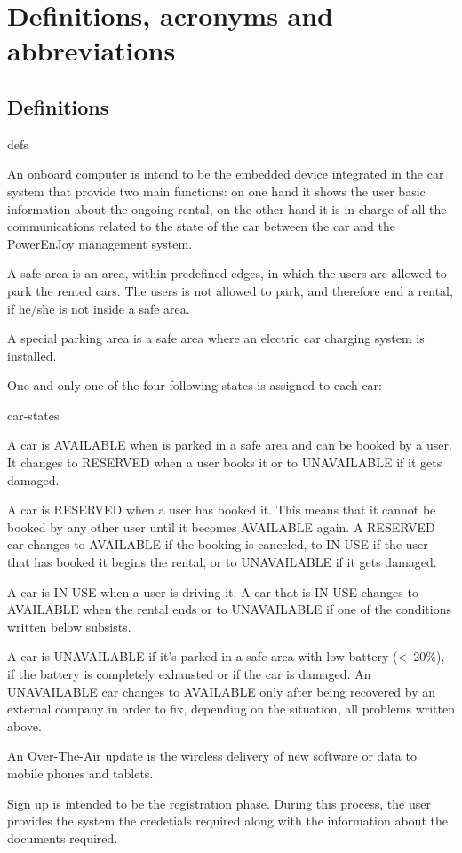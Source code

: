 \section{Definitions, acronyms and abbreviations}

\subsection{Definitions}
	\begin{labeling}{defs}
		\item[\textbf{Onboard computer}] An onboard computer is intend to be the embedded device integrated in the car system that provide two main functions: on one hand it shows the user basic information about the ongoing rental, on the other hand it is in charge of all the communications related to the state of the car between the car and the PowerEnJoy management system.
		\item[\textbf{Safe area}] A safe area is an area, within predefined edges, in which the users are allowed to park the rented cars. The users is not allowed to park, and therefore end a rental, if he/she is not inside a safe area.
		\item[\textbf{Special parking area}] A special parking area is a safe area where an electric car charging system is installed.
		\item[\textbf{Car states}] One and only one of the four following states is assigned to each car:
			\begin{labeling}{car-states}
				\item[\textbf{AVAILABLE}] A car is AVAILABLE when is parked in a safe area and can be booked by a user. It changes to RESERVED when a user books it or to UNAVAILABLE if it gets damaged.
				\item[\textbf{RESERVED}] A car is RESERVED when a user has booked it. This means that it cannot be booked by any other user until it becomes AVAILABLE again. A RESERVED car changes to AVAILABLE if the booking is canceled, to IN USE if the user that has booked it begins the rental, or to UNAVAILABLE if it gets damaged.
				\item[\textbf{IN USE}] A car is IN USE when a user is driving it. A car that is IN USE changes to AVAILABLE when the rental ends or to UNAVAILABLE if one of the conditions written below subsists.
				\item[\textbf{UNAVAILABLE}] A car is UNAVAILABLE if it's parked in a safe area with low battery (\textless\ 20\%), if the battery is completely exhausted or if the car is damaged. An UNAVAILABLE car changes to AVAILABLE only after being recovered by an external company in order to fix, depending on the situation, all problems written above.
			\end{labeling}
		\item[\textbf{Over-The-Air updates}] An Over-The-Air update is the wireless delivery of new software or data to mobile phones and tablets.
		\item[\textbf{Sign up}] Sign up is intended to be the registration phase. During this process, the user provides the system the credetials required along with the information about the documents required.
	\end{labeling}

